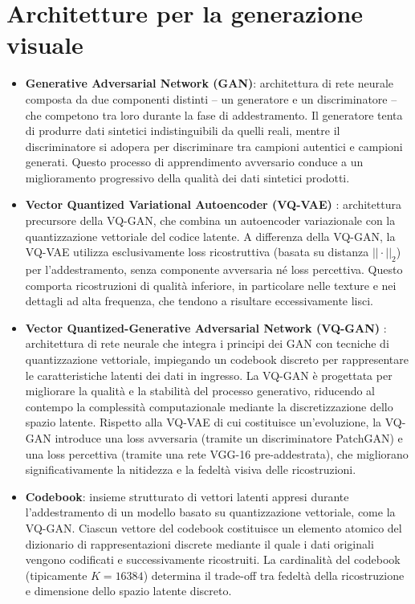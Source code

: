 \section{Architetture per la generazione visuale}
\begin{itemize}
	\item \textbf{Generative Adversarial Network (GAN)}: architettura di rete neurale composta da due componenti distinti -- un generatore e un discriminatore -- che competono tra loro durante la fase di addestramento. Il generatore tenta di produrre dati sintetici indistinguibili da quelli reali, mentre il discriminatore si adopera per discriminare tra campioni autentici e campioni generati. Questo processo di apprendimento avversario conduce a un miglioramento progressivo della qualità dei dati sintetici prodotti.
	\item \textbf{Vector Quantized Variational Autoencoder (VQ-VAE)} \cite{van-den-oord-2017}: architettura precursore della VQ-GAN, che combina un autoencoder variazionale con la quantizzazione vettoriale del codice latente. A differenza della VQ-GAN, la VQ-VAE utilizza esclusivamente loss ricostruttiva (basata su distanza $||\cdot||_2$) per l'addestramento, senza componente avversaria né loss percettiva. Questo comporta ricostruzioni di qualità inferiore, in particolare nelle texture e nei dettagli ad alta frequenza, che tendono a risultare eccessivamente lisci.
	\item \textbf{Vector Quantized-Generative Adversarial Network (VQ-GAN)} \cite{esser-2020}: architettura di rete neurale che integra i principi dei GAN con tecniche di quantizzazione vettoriale, impiegando un codebook discreto per rappresentare le caratteristiche latenti dei dati in ingresso. La VQ-GAN è progettata per migliorare la qualità e la stabilità del processo generativo, riducendo al contempo la complessità computazionale mediante la discretizzazione dello spazio latente. Rispetto alla VQ-VAE di cui costituisce un'evoluzione, la VQ-GAN introduce una loss avversaria (tramite un discriminatore PatchGAN) e una loss percettiva (tramite una rete VGG-16 pre-addestrata), che migliorano significativamente la nitidezza e la fedeltà visiva delle ricostruzioni.
	\item \textbf{Codebook}: insieme strutturato di vettori latenti appresi durante l'addestramento di un modello basato su quantizzazione vettoriale, come la VQ-GAN. Ciascun vettore del codebook costituisce un elemento atomico del dizionario di rappresentazioni discrete mediante il quale i dati originali vengono codificati e successivamente ricostruiti. La cardinalità del codebook (tipicamente $K = 16384$) determina il trade-off tra fedeltà della ricostruzione e dimensione dello spazio latente discreto.

\end{itemize}
